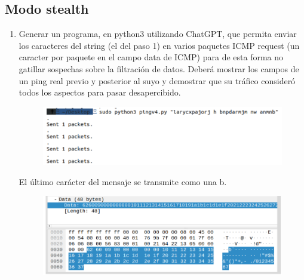 \documentclass[letter,12pt]{article}
\begin{document}
\subsection{Modo stealth}

\begin{enumerate}
    \item Generar un programa, en python3 utilizando ChatGPT, que permita enviar
los caracteres del string (el del paso 1) en varios paquetes ICMP request (un
caracter por paquete en el campo data de ICMP) para de esta forma no gatillar
sospechas sobre la filtración de datos.  Deberá mostrar los campos de un ping
real previo y posterior al suyo y demostrar que su tráfico consideró todos los
aspectos para pasar desapercibido.
    \begin{figure}[H]
        \centering
        \includegraphics[width=15cm]{actividades/A2.1.png}
        \label{fig:a2-1}
    \end{figure}
    El último carácter del mensaje se transmite como una b.
    \begin{figure}[H]
            \centering
            \includegraphics[width=15cm]{actividades/A2.2.png}
            \label{fig:a2-2}
        \end{figure}
\end{enumerate}
\end{document}
